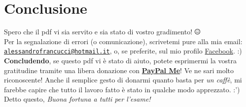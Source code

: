 \documentclass[oneside]{book}
\newcommand{\mail}[1]{\href{mailto:#1}{\texttt{#1}}}
\begin{document}
\chapter{Conclusione}
	Spero che il pdf vi sia servito e sia stato di vostro gradimento! \includegraphics[height = 3mm]{images/smile.png} \\

	Per la segnalazione di errori (o comunicazione), scrivetemi pure alla mia email: \mail{alessandrofrancucci@hotmail.it}, o, se preferite, sul mio profilo \href{https://www.facebook.com/FlyceAlex}{Facebook}. :) \\


	\textbf{Concludendo}, se questo pdf vi è stato di aiuto, potete esprimermi la vostra gratitudine tramite una libera donazione con \href{https://www.paypal.me/alexflyce}{\textbf{PayPal Me}}! Ve ne sari molto riconoscente! Anche il semplice gesto di donarmi quanto basta per \emph{un caffè}, mi farebbe capire che tutto il lavoro fatto è stato in qualche modo apprezzato. :') \\

	Detto questo, \emph{Buona fortuna a tutti per l'esame!}
\end{document}
